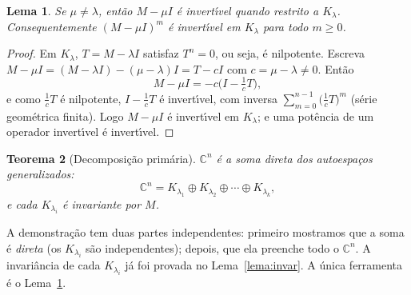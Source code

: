 \documentclass[11pt,a4paper]{amsart}
\newcommand{\C}{\mathbb{C}}
\theoremstyle{plain}
\newtheorem{teorema}{Teorema}[section]
\newtheorem{lema}[teorema]{Lema}
\theoremstyle{definition}
\theoremstyle{remark}
\begin{document}
\begin{lema}\label{lema:invertivel}
Se $\mu\neq\lambda$, ent\~ao $M-\mu I$ \'e invert\'\i vel quando restrito a
$K_\lambda$. Consequentemente $(M-\mu I)^m$ \'e invert\'\i vel em $K_\lambda$
para todo $m\ge0$.
\end{lema}

\begin{proof}
Em $K_\lambda$, $T=M-\lambda I$ satisfaz $T^n=0$, ou seja, \'e nilpotente.
Escreva $M-\mu I = (M-\lambda I) - (\mu-\lambda)I = T - cI$ com
$c=\mu-\lambda\neq0$. Ent\~ao
\[
  M-\mu I = -c\Big(I - \tfrac{1}{c}T\Big),
\]
e como $\tfrac1c T$ \'e nilpotente, $I-\tfrac1c T$ \'e invert\'\i vel, com
inversa $\sum_{m=0}^{n-1}\big(\tfrac1c T\big)^m$ (s\'erie geom\'etrica finita).
Logo $M-\mu I$ \'e invert\'\i vel em $K_\lambda$; e uma pot\^encia de um operador
invert\'\i vel \'e invert\'\i vel.
\end{proof}

\begin{teorema}[Decomposi\c{c}\~ao prim\'aria]\label{thm:primaria}
$\C^n$ \'e a soma direta dos autoespa\c{c}os generalizados:
\[
  \C^n = K_{\lambda_1}\oplus K_{\lambda_2}\oplus\cdots\oplus K_{\lambda_k},
\]
e cada $K_{\lambda_i}$ \'e invariante por $M$.
\end{teorema}

A demonstra\c{c}\~ao tem duas partes independentes: primeiro mostramos que a
soma \'e \emph{direta} (os $K_{\lambda_i}$ s\~ao independentes); depois, que ela
preenche todo o $\C^n$. A invari\^ancia de cada $K_{\lambda_i}$ j\'a foi provada
no Lema~\ref{lema:invar}. A \'unica ferramenta \'e o
Lema~\ref{lema:invertivel}.
\end{document}
